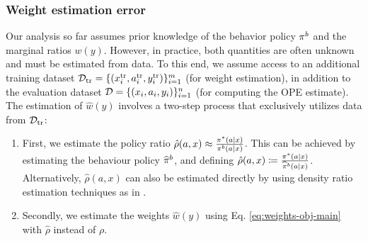 \subsubsection{Weight estimation error}\label{subsec:weight-estimation-error}
Our analysis so far assumes prior knowledge of the behavior policy $\pi^b$ and the marginal ratios $w(y)$. However, in practice, both quantities are often unknown and must be estimated from data. To this end, we assume access to an additional training dataset $\mathcal{D}_{\textup{tr}} = \{(x^{\textup{tr}}_i, a^{\textup{tr}}_i, y^{\textup{tr}}_i)\}_{i=1}^m$ (for weight estimation), in addition to the evaluation dataset $\mathcal{D} = \{(x_i, a_i, y_i)\}_{i=1}^n$ (for computing the OPE estimate). 
The estimation of $\hat{w}(y)$ involves a two-step process that exclusively utilizes data from $\mathcal{D}_{\textup{tr}}$:
\begin{enumerate}[label=(\roman*)]
    \item First, we estimate the policy ratio $\hat{\rho}(a, x) \approx \frac{\pi^*(a | x)}{\pi^b(a | x)}$. This can be achieved by estimating the behaviour policy $\widehat{\pi}^b$, and defining $\hat{\rho}(a, x)\coloneqq \frac{\pi^*(a\mid x)}{\widehat{\pi}^b(a\mid x)}$. Alternatively, $\hat{\rho}(a, x)$ can also be estimated directly by using density ratio estimation techniques as in \cite{sondhi2020balanced}.
    \item Secondly, we estimate the weights $\hat{w}(y)$ using Eq. \eqref{eq:weights-obj-main} with $\hat{\rho}$ instead of $\rho$.
\end{enumerate}

